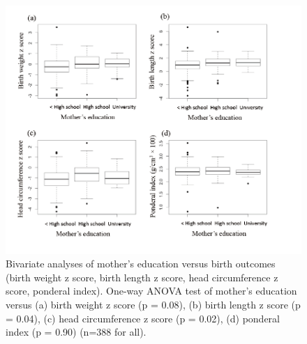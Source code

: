 \begin{figure}
  \centering
    \label{fig:Fig326}
  \includegraphics[scale=1]{Figures/Fig326.pdf}
  \caption[Bivariate analyses of mother's education versus birth outcomes (birth weight z score, birth length z score, head circumference z score, ponderal index)]{Bivariate analyses of mother's education versus birth outcomes (birth weight z score, birth length z score, head circumference z score, ponderal index). One-way ANOVA test of mother's education versus (a) birth weight z score (p = 0.08), (b) birth length z score (p = 0.04), (c) head circumference z score (p = 0.02), (d) ponderal index (p = 0.90) (n=388 for all).}
\end{figure}


